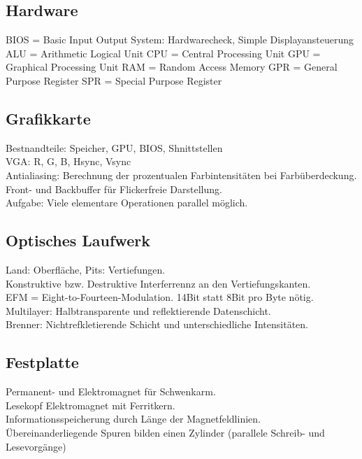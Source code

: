 \documentclass[fs]{latex4ei}
\begin{document}
\begin{multicols}{4}



	\section{Hardware}
	BIOS = Basic Input Output System: Hardwarecheck, Simple Displayansteuerung\\
	ALU = Arithmetic Logical Unit
	CPU = Central Processing Unit
	GPU = Graphical Processing Unit
	RAM = Random Access Memory
	GPR = General Purpose Register
	SPR = Special Purpose Register
	
	
	\subsection{Grafikkarte}
	Bestnandteile: Speicher, GPU, BIOS, Shnittstellen\\
	VGA: R, G, B, Hsync, Vsync\\
	Antialiasing: Berechnung der prozentualen Farbintensitäten bei Farbüberdeckung.\\
	Front- und Backbuffer für Flickerfreie Darstellung.\\
	Aufgabe: Viele elementare Operationen parallel möglich. 

	\subsection{Optisches Laufwerk}
	Land: Oberfläche, Pits: Vertiefungen.\\
	Konstruktive bzw. Destruktive Interferrennz an den Vertiefungskanten.\\
	EFM = Eight-to-Fourteen-Modulation. 14Bit statt 8Bit pro Byte nötig.\\
	Multilayer: Halbtransparente und reflektierende Datenschicht.\\
	Brenner: Nichtrefkletierende Schicht und unterschiedliche Intensitäten.
	
	\subsection{Festplatte}
	Permanent- und Elektromagnet für Schwenkarm.\\
	Lesekopf Elektromagnet mit Ferritkern.\\
	Informationsspeicherung durch Länge der Magnetfeldlinien.\\
	Übereinanderliegende Spuren bilden einen Zylinder (parallele Schreib- und Lesevorgänge)\\
	

\end{multicols}
\end{document}
